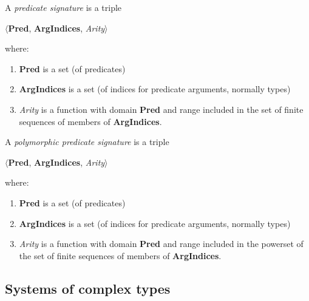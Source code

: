 A \textit{predicate signature} 
is a triple
\begin{display}
$\langle$\textbf{Pred}, \textbf{ArgIndices}, \textit{Arity}$\rangle$
\end{display}
where:
\begin{enumerate} 
 
\item \textbf{Pred} is a set (of predicates)

\item \textbf{ArgIndices} is a set (of indices for predicate
  arguments, normally types)
 
\item \textit{Arity} is a function with domain \textbf{Pred} and range
  included in the set of finite sequences of members of \textbf{ArgIndices}. 
 
\end{enumerate}

\medskip

A \textit{polymorphic predicate signature} 
is a triple 
\begin{display}
$\langle$\textbf{Pred}, \textbf{ArgIndices}, \textit{Arity}$\rangle$
\end{display}
where:
\begin{enumerate} 
 
\item \textbf{Pred} is a set (of predicates)

\item \textbf{ArgIndices} is a set (of indices for predicate
  arguments, normally types)
 
\item \textit{Arity} is a function with domain \textbf{Pred} and range
  included in the powerset of the set of finite sequences of members
  of \textbf{ArgIndices}. 
 
\end{enumerate}
 

\subsection{Systems of complex types}
\label{app:comptypes}

